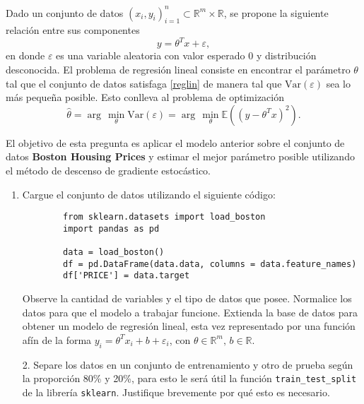 Dado un conjunto de datos $(x_i,y_i)_{i=1}^n\subset\mathbb{R}^m\times\mathbb{R}$, se propone la siguiente relación entre sus componentes
\begin{equation}\label{reglin}
  y = \theta^Tx + \varepsilon,
\end{equation}
en donde $\varepsilon$ es una variable aleatoria con valor esperado 0 y distribución desconocida. El problema de regresión lineal consiste en encontrar el parámetro $\theta$ tal que el conjunto de datos satisfaga \eqref{reglin} de manera tal que $\mathrm{Var}(\varepsilon)$ sea lo más pequeña posible. Esto conlleva al problema de optimización
\[ \hat{\theta} = \arg\,\min_{\theta} \mathrm{Var}(\varepsilon) = \arg\,\min_{\theta}\mathbb{E}\left((y-\theta^Tx)^2\right).\]

El objetivo de esta pregunta es aplicar el modelo anterior sobre el conjunto de datos \textbf{Boston Housing Prices} y estimar el mejor parámetro posible utilizando el método de descenso de gradiente estocástico. 
\begin{enumerate}
    \item Cargue el conjunto de datos utilizando el siguiente código:
      \begin{verbatim}
        from sklearn.datasets import load_boston
        import pandas as pd
        
        data = load_boston()
        df = pd.DataFrame(data.data, columns = data.feature_names)
        df['PRICE'] = data.target
    \end{verbatim}
    
    Observe la cantidad de variables y el tipo de datos que posee. Normalice los datos para que el modelo a trabajar funcione. Extienda la base de datos para obtener un modelo de regresión lineal, esta vez representado por una función afín de la forma $y_i = \theta^Tx_i + b + \varepsilon_i$, con $\theta\in \mathbb{R}^m,\,b\in \mathbb{R}$.
\end{enumerate}

\begin{enumerate}    
    \item[2.] Separe los datos en un conjunto de entrenamiento y otro de prueba según la proporción 80\% y 20\%, para esto le será útil la función \texttt{train\_test\_split} de la librería \texttt{sklearn}. Justifique brevemente por qué esto es necesario.
\end{enumerate}

